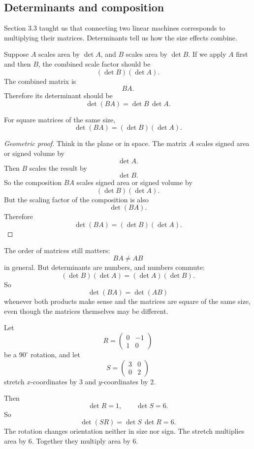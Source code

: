 \subsection{Determinants and composition}

Section 3.3 taught us that connecting two linear machines corresponds to multiplying
their matrices.  Determinants tell us how the size effects combine.

Suppose \(A\) scales area by \(\det A\), and \(B\) scales area by \(\det B\).  If we apply
\(A\) first and then \(B\), the combined scale factor should be
\[
    (\det B)(\det A).
\]
The combined matrix is
\[
    BA.
\]
Therefore its determinant should be
\[
    \det(BA)=\det B\,\det A.
\]

\begin{theorem}
For square matrices of the same size,
\[
\boxed{
    \det(BA)=(\det B)(\det A).
}
\]
\end{theorem}

\begin{proof}[Geometric proof]
Think in the plane or in space.  The matrix \(A\) scales signed area or signed volume by
\[
    \det A.
\]
Then \(B\) scales the result by
\[
    \det B.
\]
So the composition \(BA\) scales signed area or signed volume by
\[
    (\det B)(\det A).
\]
But the scaling factor of the composition is also
\[
    \det(BA).
\]
Therefore
\[
    \det(BA)=(\det B)(\det A).
\]
\end{proof}

The order of matrices still matters:
\[
    BA\neq AB
\]
in general.  But determinants are numbers, and numbers commute:
\[
    (\det B)(\det A)=(\det A)(\det B).
\]
So
\[
    \det(BA)=\det(AB)
\]
whenever both products make sense and the matrices are square of the same size, even
though the matrices themselves may be different.

\begin{example}
Let
\[
    R=
    \begin{pmatrix}
        0&-1\\
        1&0
    \end{pmatrix}
\]
be a \(90^\circ\) rotation, and let
\[
    S=
    \begin{pmatrix}
        3&0\\
        0&2
    \end{pmatrix}
\]
stretch \(x\)-coordinates by \(3\) and \(y\)-coordinates by \(2\).

Then
\[
    \det R=1,
    \qquad
    \det S=6.
\]
So
\[
    \det(SR)=\det S\,\det R=6.
\]
The rotation changes orientation neither in size nor sign.  The stretch multiplies area
by \(6\).  Together they multiply area by \(6\).
\end{example}

